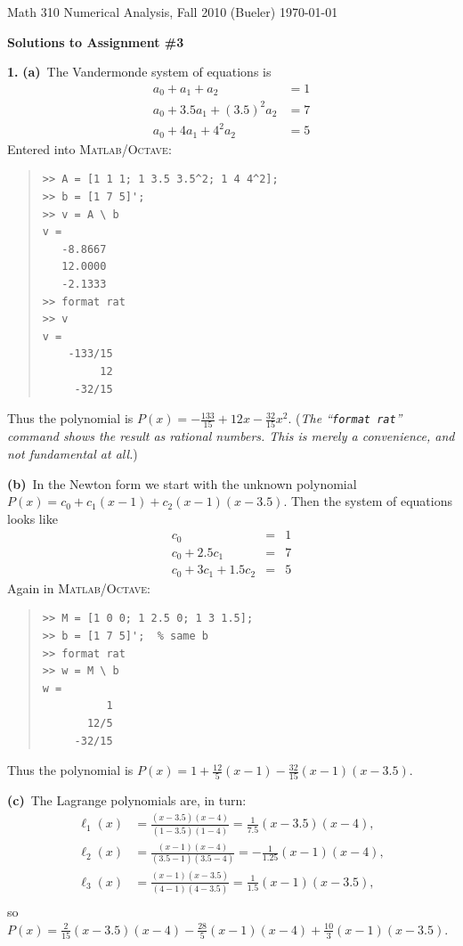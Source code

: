 \documentclass[11pt]{amsart}
\newcommand{\MO}{\textsc{Matlab/Octave}\xspace}
\newcommand{\ppart}[1]{\textbf{(#1)}\, }
\newcommand{\epart}[1]{\medskip\noindent\quad\textbf{(#1)}\, }
\newcommand{\prob}[1]{\medskip\noindent\textbf{#1.}\quad }
\begin{document}
\scriptsize \noindent Math 310 Numerical Analysis, Fall 2010 (Bueler) \hfill \today
\normalsize\bigskip
\thispagestyle{empty}

\Large
\centerline{\textbf{Solutions to Assignment \#3}}
\normalsize

\medskip

\prob{1} \ppart{a} The Vandermonde system of equations is
\begin{align*}
a_0 + a_1 + a_2 &= 1 \\
a_0 + 3.5 a_1 + (3.5)^2 a_2 &= 7 \\
a_0 + 4 a_1 + 4^2 a_2 &= 5
\end{align*}
Entered into \MO:
\small \begin{quote}\begin{Verbatim}
>> A = [1 1 1; 1 3.5 3.5^2; 1 4 4^2];
>> b = [1 7 5]';
>> v = A \ b
v =
   -8.8667
   12.0000
   -2.1333
>> format rat
>> v
v =
    -133/15
         12
     -32/15
\end{Verbatim}
\end{quote} \normalsize
Thus the polynomial is $P(x) = -\frac{133}{15} + 12 x - \frac{32}{15} x^2$.  \quad (\emph{The ``\emph{\texttt{format rat}}'' command shows the result as rational numbers.  This is merely a convenience, and not fundamental at all.})


\epart{b} In the Newton form we start with the unknown polynomial $P(x) = c_0 + c_1(x-1) + c_2(x-1)(x-3.5)$.  Then the system of equations looks like
$$\begin{array}{lcl}
c_0      &=& 1 \\
c_0 + 2.5 c_1    &=& 7 \\
c_0 + 3 c_1 + 1.5 c_2  &=& 5
\end{array}$$
Again in \MO:
\small \begin{quote}\begin{Verbatim}
>> M = [1 0 0; 1 2.5 0; 1 3 1.5];
>> b = [1 7 5]';  % same b
>> format rat
>> w = M \ b
w =
          1
       12/5
     -32/15
\end{Verbatim}
\end{quote} \normalsize
Thus the polynomial is $P(x) = 1 + \frac{12}{5}(x-1) - \frac{32}{15}(x-1)(x-3.5)$.

\epart{c} The Lagrange polynomials are, in turn:
\begin{align*}
\ell_1(x) &= \frac{(x-3.5)(x-4)}{(1-3.5)(1-4)} = \frac{1}{7.5} (x-3.5)(x-4), \\
\ell_2(x) &= \frac{(x-1)(x-4)}{(3.5-1)(3.5-4)} = - \frac{1}{1.25} (x-1)(x-4), \\
\ell_3(x) &= \frac{(x-1)(x-3.5)}{(4-1)(4-3.5)} = \frac{1}{1.5} (x-1)(x-3.5), \\
\end{align*}
so $P(x) = \frac{2}{15} (x-3.5)(x-4) - \frac{28}{5} (x-1)(x-4) + \frac{10}{3} (x-1)(x-3.5)$.
\end{document}
